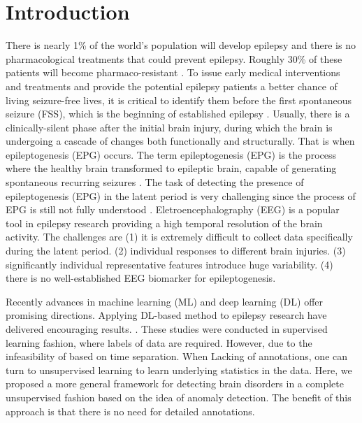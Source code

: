 \documentclass[pmlr]{jmlr}%
\begin{document}
\section{Introduction}
%
%
%
There is nearly 1\% of the world's population will develop epilepsy and there is no pharmacological treatments that could prevent epilepsy. Roughly 30\% of these patients will become pharmaco-resistant \citep{kwan2000early}. To issue early medical interventions and treatments and provide the potential epilepsy patients a better chance of living seizure-free lives, it is critical to identify them before the first spontaneous seizure (FSS), which is the beginning of established epilepsy \cite{moshe2015epilepsy}. 
Usually, there is a clinically-silent phase after the initial brain injury, during which the brain is undergoing a cascade of changes both functionally and structurally. That is when epileptogenesis (EPG) occurs. The term epileptogenesis (EPG) is the process where the healthy brain transformed to epileptic brain, capable of generating spontaneous recurring seizures \cite{loscher2019holy, pitkanen2014past}. 
The task of detecting the presence of epileptogenesis (EPG) in the latent period is very challenging since the process of EPG is still not fully understood \cite{pitkanen2016advances}. Eletroencephalography (EEG) is a popular tool in epilepsy research providing a high temporal resolution of the brain activity. The challenges are (1) it is extremely difficult to collect data specifically during the latent period. (2) individual responses to different brain injuries. (3) significantly individual representative features introduce huge variability. (4) there is no well-established EEG biomarker for epileptogenesis.

Recently advances in machine learning (ML) and deep learning (DL) offer promising directions. Applying DL-based method to epilepsy research have delivered encouraging results. \cite{lu2020towards, lu2020staging, rizzi2019changes}. These studies were conducted in supervised learning fashion, where labels of data are required. However, due to the infeasibility of based on time separation. When Lacking of annotations, one can turn to unsupervised learning to learn underlying statistics in the data. 	
Here, we proposed a more general framework for detecting brain disorders in a complete unsupervised fashion based on the idea of anomaly detection. The benefit of this approach is that there is no need for detailed annotations.
\end{document}
